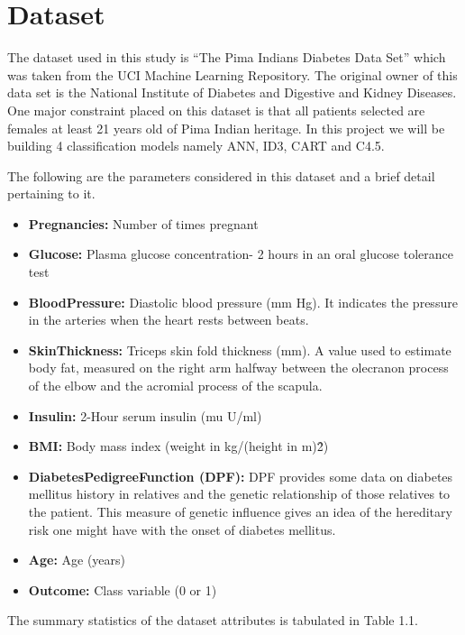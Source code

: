 \section{Dataset}
The dataset used in this study is “The Pima Indians Diabetes Data Set” which was taken from the UCI Machine Learning Repository. The original owner of this data set is the National Institute of Diabetes and Digestive and Kidney Diseases. One major constraint placed on this dataset is that all patients selected are females at least 21 years old of Pima Indian heritage. In this project we will be building 4 classification models namely ANN, ID3, CART and C4.5.\par \noindent
The following are the parameters considered in this dataset and a brief detail pertaining to it.
\begin{itemize}
\item \textbf{Pregnancies:} Number of times pregnant
\item \textbf{Glucose:} Plasma glucose concentration- 2 hours in an oral glucose tolerance test
\item \textbf{BloodPressure:} Diastolic blood pressure (mm Hg). It indicates the pressure in the arteries when the heart rests between beats.
\item \textbf{SkinThickness:} Triceps skin fold thickness (mm). A value used to estimate body fat, measured on the right arm halfway between the olecranon process of the elbow and the acromial process of the scapula.
\item \textbf{Insulin:} 2-Hour serum insulin (mu U/ml)
\item \textbf{BMI:} Body mass index (weight in kg/(height in m)\^2)
\item \textbf{DiabetesPedigreeFunction (DPF):} DPF provides some data on diabetes mellitus history in relatives and the genetic relationship of those relatives to the patient. This measure of genetic influence gives an idea of the hereditary risk one might have with the onset of diabetes mellitus.
\item \textbf{Age:} Age (years)
\item \textbf{Outcome:} Class variable (0 or 1)
\end{itemize}
The summary statistics of the dataset attributes is tabulated in Table 1.1.
\pagebreak
